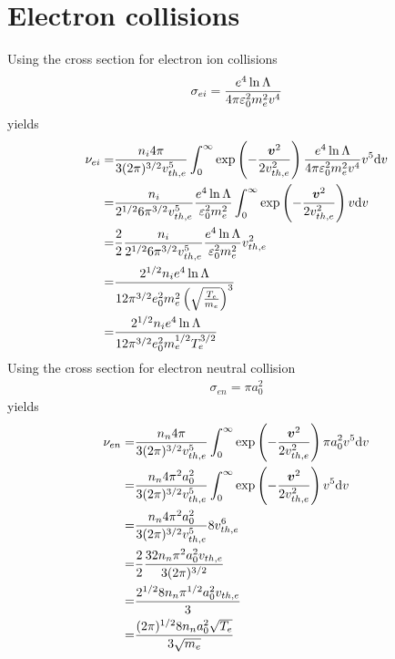 \section{Electron collisions}
\label{sec:nue}
Using the cross section for electron ion collisions
%
\begin{align*}
    \sigma_{ei} = \frac{e^4\ln\Lambda}{4\pi\varepsilon_0^2m_e^2v^4}
\end{align*}
%
yields
%
\begin{align*}
    \nu_{ei}
    =&
    \frac{n_i4\pi}{3(2\pi)^{3/2}v_{th,e}^5}
    \int_0^\infty
    \exp\left(-\frac{\boldsymbol{v}^2}{2v_{th,e}^2}\right)
    \frac{e^4\ln\Lambda}{4\pi\varepsilon_0^2m_e^2v^4} v^5
    \text{d} v
    \\
    =&
    \frac{n_i}{2^{1/2}6\pi^{3/2}v_{th,e}^5}
    \frac{e^4\ln\Lambda}{\varepsilon_0^2m_e^2}
    \int_0^\infty
    \exp\left(-\frac{\boldsymbol{v}^2}{2v_{th,e}^2}\right)
    v \text{d} v
    \\
    =&
    \frac{2}{2}
    \frac{n_i}{2^{1/2}6\pi^{3/2}v_{th,e}^5}
    \frac{e^4\ln\Lambda}{\varepsilon_0^2m_e^2}
    v_{th,e}^2
    \\
    =&
    \frac{2^{1/2}n_ie^4\ln\Lambda}{12\pi^{3/2}e_0^2m_e^2\left(\sqrt{\frac{T_e}{m_e}}\right)^3}
    \\
    =&
    \frac{2^{1/2}n_ie^4\ln\Lambda}{12\pi^{3/2}e_0^2m_e^{1/2}T_e^{3/2}}
\end{align*}
%
Using the cross section for electron neutral collision
%
\begin{align*}
    \sigma_{en} = \pi a_0^2
\end{align*}
%
yields
%
\begin{align*}
    \nu_{en}
    =&
    \frac{n_n4\pi}{3(2\pi)^{3/2}v_{th,e}^5}
    \int_0^\infty
    \exp\left(-\frac{\boldsymbol{v}^2}{2v_{th,e}^2}\right)
    \pi a_0^2 v^5
    \text{d} v
    \\
    =&
    \frac{n_n4\pi^2 a_0^2 }{3(2\pi)^{3/2}v_{th,e}^5}
    \int_0^\infty
    \exp\left(-\frac{\boldsymbol{v}^2}{2v_{th,e}^2}\right)
    v^5
    \text{d} v
    \\
    =&
    \frac{n_n4\pi^2 a_0^2 }{3(2\pi)^{3/2}v_{th,e}^5} 8v_{th,e}^6
    \\
    =&
    \frac{2}{2}
    \frac{32 n_n\pi^2 a_0^2 v_{th,e}}{3(2\pi)^{3/2}}
    \\
    =&
    \frac{2^{1/2}8 n_n\pi^{1/2} a_0^2 v_{th,e}}{3}
    \\
    =&
    \frac{(2\pi)^{1/2}8 n_n a_0^2 \sqrt{T_e}}{3\sqrt{m_e}}
\end{align*}
%

